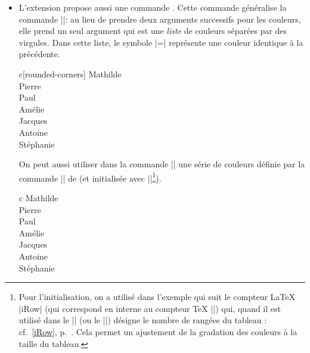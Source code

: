 \documentclass[dvipsnames]{article}
\begin{document}
\begin{itemize}[beginpenalty=10000]
\medbreak
\item L'extension  propose aussi une commande
. Cette commande généralise la commande
|\rowcolors|: au lieu de prendre deux arguments successifs pour les couleurs,
elle prend un seul argument qui est une \emph{liste} de couleurs séparées par
des virgules. Dans cette liste, le symbole |=| représente une couleur identique
à la précédente.

\smallskip
\begin{Code}[width=10cm,show-output,no-cell-nodes]
\begin{NiceTabular}{c}[rounded-corners]
\CodeBefore
  \emph{}
\Body
  Mathilde \\
  Pierre \\
  Paul \\
  Amélie \\
  Jacques \\
  Antoine \\
  Stéphanie \\
\end{NiceTabular}
\end{Code}

\bigbreak
On peut aussi utiliser dans la commande |\rowlistcolors| une série de couleurs
définie par la commande || de  (et initialisée
avec |\resetcolorseries|\footnote{Pour l'initialisation, on a utilisé dans
  l'exemple qui suit le compteur LaTeX |iRow| (qui correspond en interne au
  compteur TeX |\c@iRow|) qui, quand il est utilisé dans le |\CodeBefore| (ou le
  |\CodeAfter|) désigne le nombre de rangées du tableau : cf.~\ref{iRow},
  p.~\pageref{iRow}. Cela permet un ajustement de la gradation des couleurs à la
  taille du tableau.}).


\smallskip
\begin{Code}[width=12cm,show-output,no-cell-nodes]
\begin{NiceTabular}{c}
\CodeBefore
   \emph{
   \resetcolorseries[\value{iRow}]{BlueWhite}
   }
\Body
  Mathilde \\
  Pierre \\
  Paul \\
  Amélie \\
  Jacques \\
  Antoine \\
  Stéphanie \\
\end{NiceTabular}
\end{Code}

\end{itemize}
\end{document}
